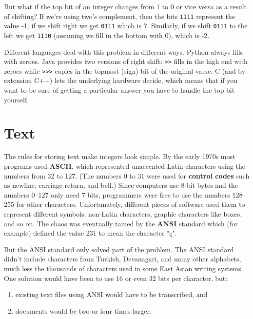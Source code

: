 \documentclass{scrbook}
\newcommand{\glossref}[1]{\textbf{#1}}
\begin{document}
But what if the top bit of an integer changes from 1 to 0 or vice versa as a result of shifting?
If we're using two's complement,
then the bits \texttt{1111} represent the value -1;
if we shift right we get \texttt{0111} which is 7.
Similarly,
if we shift \texttt{0111} to the left we get \texttt{1110} (assuming we fill in the bottom with 0),
which is -2.


Different languages deal with this problem in different ways.
Python always fills with zeroes.
Java provides two versions of right shift:
\texttt{>>} fills in the high end with zeroes
while \texttt{>>>} copies in the topmost (sign) bit of the original value.
C (and by extension C++) lets the underlying hardware decide,
which means that if you want to be sure of getting a particular answer
you have to handle the top bit yourself.

\section{Text}\label{binary-text}


The rules for storing text make integers look simple.
By the early 1970s most programs used \glossref{ASCII},
which represented unaccented Latin characters using the numbers from 32 to 127.
(The numbers 0 to 31 were used for \glossref{control codes}
such as newline, carriage return, and bell.)
Since computers use 8-bit bytes and the numbers 0–127 only need 7 bits,
programmers were free to use the numbers 128–255 for other characters.
Unfortunately,
different pieces of software used them to represent different symbols:
non-Latin characters,
graphic characters like boxes,
and so on.
The chaos was eventually tamed by the \glossref{ANSI} standard
which (for example) defined the value 231 to mean the character "ç".


But the ANSI standard only solved part of the problem.
The ANSI standard didn't include characters from Turkish, Devanagari, and many other alphabets,
much less the thousands of characters used in some East Asian writing systems.
One solution would have been to use 16 or even 32 bits per character,
but:

\begin{enumerate}

\item existing text files using ANSI would have to be transcribed, and

\item documents would be two or four times larger.

\end{enumerate}
\end{document}
